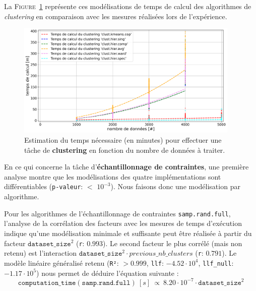 			La \textsc{Figure~\ref{figure:4.3.2-ETUDE-COUTS-TEMPS-CALCUL-MODELISATION-CLUSTERING}} représente ces modélisations de temps de calcul des algorithmes de \textit{clustering} en comparaison avec les mesures réalisées lors de l'expérience.
			\newline
			\begin{figure}[!htb]
				\centering
				\includegraphics[width=0.95\textwidth]{figures/etude-temps-calcul-modelisation-3clust}
				\caption{
					Estimation du temps nécessaire (en minutes) pour effectuer une tâche de \textbf{clustering} en fonction du nombre de données à traiter.
				}
				\label{figure:4.3.2-ETUDE-COUTS-TEMPS-CALCUL-MODELISATION-CLUSTERING}
			\end{figure}
			
			
			En ce qui concerne la tâche d'\textbf{échantillonnage de contraintes}, une première analyse montre que les modélisations des quatre implémentations sont différentiables  (\texttt{p-valeur}: $<$ \texttt{$10^{-3}$}). Nous faisons donc une modélisation par algorithme.
			
			Pour les algorithmes de l'échantillonnage de contraintes \texttt{samp.rand.full}, l'analyse de la corrélation des facteurs avec les mesures de temps d'exécution indique qu'une modélisation minimale et suffisante peut être réalisée à partir du facteur $\texttt{dataset\_size}^{2}$ (\texttt{r}: $0.993$).
			Le second facteur le plus corrélé (mais non retenu) est l'interaction $\texttt{dataset\_size}^{2} \cdot previous\_nb\_clusters$ (\texttt{r}: $0.791$).
			Le modèle linéaire généralisé retenu (\texttt{R²}: $> 0.999$, \texttt{llf}: $-4.52 \cdot 10^{4}$, \texttt{llf\_null}: $-1.17 \cdot 10^{5}$) nous permet de déduire l'équation suivante :
			\begin{equation}
				\texttt{computation\_time}(\texttt{samp.rand.full})~[s]~
				\propto~8.20 \cdot 10^{-7} \cdot \texttt{dataset\_size}^{2}
			\end{equation}
			
